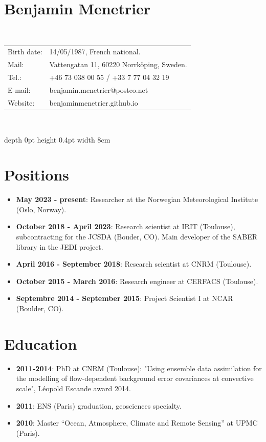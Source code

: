 \documentclass[a4paper,9pt]{scrreprt}
\begin{document}
\section*{{\huge Benjamin Menetrier}}
$  $\\
\large
\begin{tabular}{ll}
Birth date: & 14/05/1987, French national.\\[0.05cm]
Mail: &  Vattengatan 11, 60220 Norrköping, Sweden.\\[0.05cm]
Tel.: & +46 73 038 00 55 / +33 7 77 04 32 19\\[0.05cm]
E-mail: & benjamin.menetrier@posteo.net\\[0.05cm]
Website: & benjaminmenetrier.github.io\\
\end{tabular}
$  $\\
\begin{center}
{\vrule depth 0pt height 0.4pt width 8cm}
\end{center}

\section*{Positions}
\begin{itemize}
\item \textbf{May 2023 - present}: Researcher at the Norwegian Meteorological Institute (Oslo, Norway).\vspace{-0.12cm}
\item \textbf{October 2018 - April 2023}: Research scientist at IRIT (Toulouse), subcontracting for the JCSDA (Bouder, CO). Main developer of the SABER library in the JEDI project.\vspace{-0.12cm}
\item \textbf{April 2016 - September 2018}: Research scientist at CNRM (Toulouse).\vspace{-0.12cm}
\item \textbf{October 2015 - March 2016}: Research engineer at CERFACS (Toulouse).\vspace{-0.12cm}
\item \textbf{Septembre 2014 - September 2015}: Project Scientist I at NCAR (Boulder, CO).\vspace{-0.12cm}
\end{itemize}

\section*{Education}
\begin{itemize}
\item \textbf{2011-2014}: PhD at CNRM (Toulouse): "Using ensemble data assimilation for the modelling of flow-dependent background error covariances at convective scale", Léopold Escande award 2014.\vspace{-0.12cm}
\item \textbf{2011}: ENS (Paris) graduation, geosciences specialty.\vspace{-0.12cm}
\item \textbf{2010}: Master ``Ocean, Atmosphere, Climate and Remote Sensing'' at UPMC (Paris).\vspace{-0.12cm}
\end{itemize}
\end{document}
